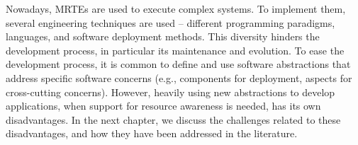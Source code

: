 Nowadays, MRTEs are used to execute complex systems.
To implement them, several engineering techniques are used -- different programming paradigms, languages, and software deployment methods.
This diversity hinders the development process, in particular its maintenance and evolution.
To ease the development process, it is common to define and use software abstractions that address specific software concerns (e.g., components for deployment, aspects for cross-cutting concerns).
However, heavily using new abstractions to develop applications, when support for resource awareness is needed, has its own disadvantages.
In the next chapter, we discuss the challenges related to these disadvantages, and how they have been addressed in the literature.  

